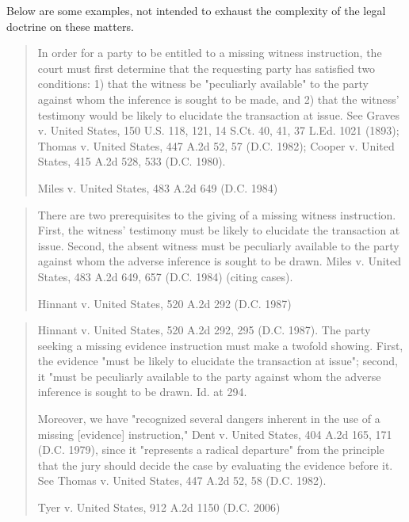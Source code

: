 \documentclass[
  10pt,
  dvipsnames,enabledeprecatedfontcommands]{scrartcl}
\begin{document}
Below are some examples, not intended to exhaust the complexity of the
legal doctrine on these matters.

\begin{quote}
In order for a party to be entitled to a missing witness instruction, the court must first determine that the requesting party has satisfied two conditions: 1) that the witness be "peculiarly available" to the party against whom the inference is sought to be made, and 2) that the witness' testimony would be likely to elucidate the transaction at issue. See Graves v. United States, 150 U.S. 118, 121, 14 S.Ct. 40, 41, 37 L.Ed. 1021 (1893); Thomas v. United States, 447 A.2d 52, 57 (D.C. 1982); Cooper  v. United States, 415 A.2d 528, 533 (D.C. 1980).

Miles v. United States, 483 A.2d 649 (D.C. 1984)
\end{quote}

\begin{quote}
There are two prerequisites to the giving of a missing witness instruction. First, the witness' testimony must be likely to elucidate the transaction at issue. Second, the absent witness must be peculiarly available to the party against whom the adverse inference is sought to be drawn. Miles v. United States, 483 A.2d 649, 657 (D.C. 1984) (citing cases).

Hinnant v. United States, 520 A.2d 292 (D.C. 1987)
\end{quote}

\begin{quote} 
Hinnant v. United States, 520 A.2d 292, 295 (D.C. 1987). The party seeking a missing evidence instruction must make a twofold showing. First, the evidence "must be likely to elucidate the transaction at issue"; second, it "must be peculiarly available to the party against whom the adverse inference is sought to be drawn. Id. at 294.

Moreover, we have "recognized several dangers inherent in the use of a missing [evidence] instruction," Dent v. United States, 404 A.2d 165, 171 (D.C. 1979), since it "represents a radical departure" from the principle that the jury should decide the case by evaluating the evidence before it. See Thomas v. United States, 447 A.2d 52, 58 (D.C. 1982).

Tyer v. United States, 912 A.2d 1150 (D.C. 2006)
\end{quote}

\end{document}
